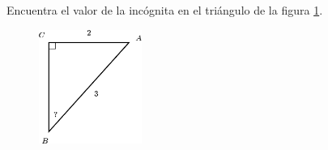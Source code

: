 Encuentra el valor de la incógnita en el triángulo de la figura \ref{fig:angle_functrig_08}.
\begin{figure}[H]
    \begin{center}
        \includegraphics[width=0.3\textwidth]{../images/angle_functrig_08.png}
    \end{center}
    \caption{}
    \label{fig:angle_functrig_08}
\end{figure}